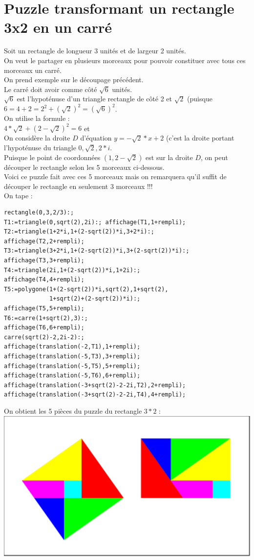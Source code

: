 \documentclass[a4paper,11pt]{book}
\begin{document}
\section{Puzzle transformant un rectangle 3x2 en un carr\'e}
Soit un rectangle de longueur 3 unit\'es et de largeur 2 unit\'es.\\
On veut le partager en plusieurs morceaux pour pouvoir constituer avec 
tous ces morceaux un carr\'e.\\
On prend exemple sur le d\'ecoupage pr\'ec\'edent.\\
Le carr\'e doit avoir comme c\^ot\'e $\sqrt 6$ unit\'es.\\
$\sqrt 6$ est l'hypot\'enuse d'un triangle rectangle de c\^ot\'e 2 et 
$\sqrt 2$ (puisque $6=4+2=2^2+(\sqrt 2)^2=(\sqrt 6)^2$.\\
On utilise la formule :\\
$4*\sqrt 2+(2-\sqrt 2)^2=6$ et\\
On consid\`ere la droite $D$ d'\'equation $y=-\sqrt 2*x+2$ (c'est la droite
portant l'hypot\'enuse du triangle $0,\sqrt 2,2*i$.\\
Puisque le point de coordonn\'ees $(1,2-\sqrt 2)$ est sur la droite $D$, on 
peut d\'ecouper le rectangle selon les 5 morceaux ci-dessous.\\
Voici ce puzzle fait avec ces 5 morceaux mais on remarquera qu'il suffit de 
d\'ecouper le rectangle en seulement 3 morceaux !!!\\
On tape :
\begin{verbatim}
rectangle(0,3,2/3):;
T1:=triangle(0,sqrt(2),2i):; affichage(T1,1+rempli);
T2:=triangle(1+2*i,1+(2-sqrt(2))*i,3+2*i):; 
affichage(T2,2+rempli);
T3:=triangle(3+2*i,1+(2-sqrt(2))*i,3+(2-sqrt(2))*i):; 
affichage(T3,3+rempli);
T4:=triangle(2i,1+(2-sqrt(2))*i,1+2i):; 
affichage(T4,4+rempli);
T5:=polygone(1+(2-sqrt(2))*i,sqrt(2),1+sqrt(2),
             1+sqrt(2)+(2-sqrt(2))*i):; 
affichage(T5,5+rempli);
T6:=carre(1+sqrt(2),3):;
affichage(T6,6+rempli);
carre(sqrt(2)-2,2i-2):;
affichage(translation(-2,T1),1+rempli);
affichage(translation(-5,T3),3+rempli);
affichage(translation(-5,T5),5+rempli);
affichage(translation(-5,T6),6+rempli);
affichage(translation(-3+sqrt(2)-2-2i,T2),2+rempli);
affichage(translation(-3+sqrt(2)-2-2i,T4),4+rempli);
\end{verbatim}
On obtient les 5 pi\`eces du puzzle du rectangle $3*2$ :\\
\includegraphics[width=\textwidth]{carresqrt6}
\end{document}
